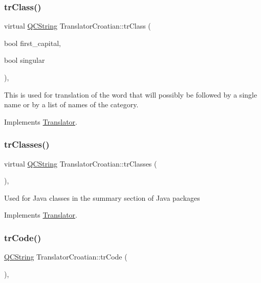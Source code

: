 \subsubsection{\texorpdfstring{trClass()}{trClass()}}
{\footnotesize\ttfamily virtual \mbox{\hyperlink{class_q_c_string}{Q\+C\+String}} Translator\+Croatian\+::tr\+Class (\begin{DoxyParamCaption}\item[{bool}]{first\+\_\+capital,  }\item[{bool}]{singular }\end{DoxyParamCaption})\hspace{0.3cm}{\ttfamily [inline]}, {\ttfamily [virtual]}}

This is used for translation of the word that will possibly be followed by a single name or by a list of names of the category. 

Implements \mbox{\hyperlink{class_translator}{Translator}}.

\mbox{\label{class_translator_croatian_adf4e675c440e0f5215b77ce4fe211fa7}} 
\subsubsection{\texorpdfstring{trClasses()}{trClasses()}}
{\footnotesize\ttfamily virtual \mbox{\hyperlink{class_q_c_string}{Q\+C\+String}} Translator\+Croatian\+::tr\+Classes (\begin{DoxyParamCaption}{ }\end{DoxyParamCaption})\hspace{0.3cm}{\ttfamily [inline]}, {\ttfamily [virtual]}}

Used for Java classes in the summary section of Java packages 

Implements \mbox{\hyperlink{class_translator}{Translator}}.

\mbox{\label{class_translator_croatian_a0b048408f4559f797aff870fdd4f988f}} 
\subsubsection{\texorpdfstring{trCode()}{trCode()}}
{\footnotesize\ttfamily \mbox{\hyperlink{class_q_c_string}{Q\+C\+String}} Translator\+Croatian\+::tr\+Code (\begin{DoxyParamCaption}{ }\end{DoxyParamCaption})\hspace{0.3cm}{\ttfamily [inline]}, {\ttfamily [virtual]}}

